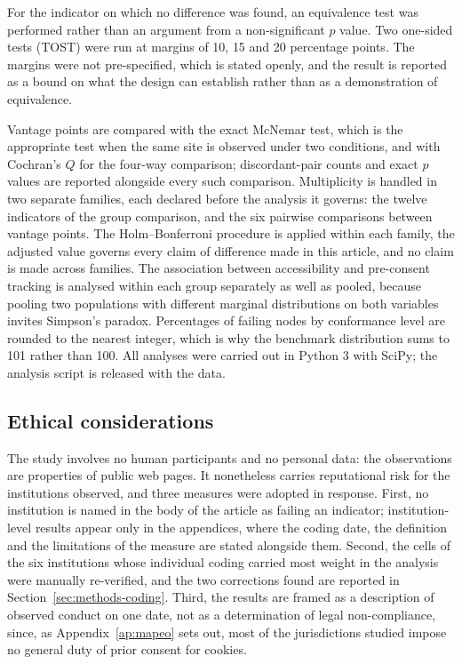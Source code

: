 \documentclass[pdflatex,sn-basic,Numbered,iicol]{sn-jnl}
\theoremstyle{thmstyleone}
\theoremstyle{thmstyletwo}
\theoremstyle{thmstylethree}
\begin{document}
	For the indicator on which no difference was found, an equivalence test was performed rather than an argument from a non-significant $p$ value. Two one-sided tests (TOST) were run at margins of 10, 15 and 20 percentage points. The margins were not pre-specified, which is stated openly, and the result is reported as a bound on what the design can establish rather than as a demonstration of equivalence.
	
	Vantage points are compared with the exact McNemar test, which is the appropriate test when the same site is observed under two conditions, and with Cochran's $Q$ for the four-way comparison; discordant-pair counts and exact $p$ values are reported alongside every such comparison. Multiplicity is handled in two separate families, each declared before the analysis it governs: the twelve indicators of the group comparison, and the six pairwise comparisons between vantage points. The Holm--Bonferroni procedure is applied within each family, the adjusted value governs every claim of difference made in this article, and no claim is made across families. The association between accessibility and pre-consent tracking is analysed within each group separately as well as pooled, because pooling two populations with different marginal distributions on both variables invites Simpson's paradox. Percentages of failing nodes by conformance level are rounded to the nearest integer, which is why the benchmark distribution sums to 101 rather than 100. All analyses were carried out in Python 3 with SciPy; the analysis script is released with the data.
	
	\subsection{Ethical considerations}\label{sec:methods-ethics}
	
	The study involves no human participants and no personal data: the observations are properties of public web pages. It nonetheless carries reputational risk for the institutions observed, and three measures were adopted in response. First, no institution is named in the body of the article as failing an indicator; institution-level results appear only in the appendices, where the coding date, the definition and the limitations of the measure are stated alongside them. Second, the cells of the six institutions whose individual coding carried most weight in the analysis were manually re-verified, and the two corrections found are reported in Section~\ref{sec:methods-coding}. Third, the results are framed as a description of observed conduct on one date, not as a determination of legal non-compliance, since, as Appendix~\ref{ap:mapeo} sets out, most of the jurisdictions studied impose no general duty of prior consent for cookies.
	
\end{document}
